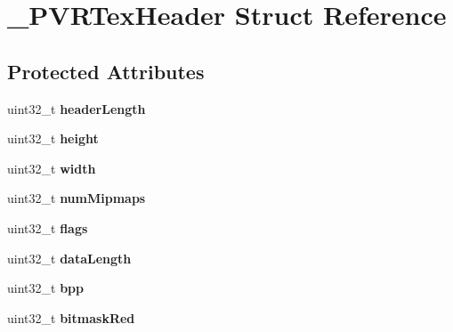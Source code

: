\hypertarget{struct___p_v_r_tex_header}{\section{\-\_\-\-P\-V\-R\-Tex\-Header Struct Reference}
\label{struct___p_v_r_tex_header}
}
\subsection*{Protected Attributes}
\begin{DoxyCompactItemize}
\item 
\hypertarget{struct___p_v_r_tex_header_af4e2f3801dcceec54f26a625042bac1f}{uint32\-\_\-t {\bfseries header\-Length}}\label{struct___p_v_r_tex_header_af4e2f3801dcceec54f26a625042bac1f}

\item 
\hypertarget{struct___p_v_r_tex_header_ac6a51835a66cdbe45badfb3dee2cbffb}{uint32\-\_\-t {\bfseries height}}\label{struct___p_v_r_tex_header_ac6a51835a66cdbe45badfb3dee2cbffb}

\item 
\hypertarget{struct___p_v_r_tex_header_ac81635418fc280a63ee4189895c6d406}{uint32\-\_\-t {\bfseries width}}\label{struct___p_v_r_tex_header_ac81635418fc280a63ee4189895c6d406}

\item 
\hypertarget{struct___p_v_r_tex_header_ade97b934b4f0e244cf0e0a552aed7fda}{uint32\-\_\-t {\bfseries num\-Mipmaps}}\label{struct___p_v_r_tex_header_ade97b934b4f0e244cf0e0a552aed7fda}

\item 
\hypertarget{struct___p_v_r_tex_header_acbf0b743d3be4bd800238032f45deb22}{uint32\-\_\-t {\bfseries flags}}\label{struct___p_v_r_tex_header_acbf0b743d3be4bd800238032f45deb22}

\item 
\hypertarget{struct___p_v_r_tex_header_aef963a7fb98605c3a816bce5b7fc7b22}{uint32\-\_\-t {\bfseries data\-Length}}\label{struct___p_v_r_tex_header_aef963a7fb98605c3a816bce5b7fc7b22}

\item 
\hypertarget{struct___p_v_r_tex_header_a2e90ef4f7793526e081159213d9118fe}{uint32\-\_\-t {\bfseries bpp}}\label{struct___p_v_r_tex_header_a2e90ef4f7793526e081159213d9118fe}

\item 
\hypertarget{struct___p_v_r_tex_header_aad4d192ffbdb955972e32840fe01d1e2}{uint32\-\_\-t {\bfseries bitmask\-Red}}\label{struct___p_v_r_tex_header_aad4d192ffbdb955972e32840fe01d1e2}


\end{DoxyCompactItemize}
